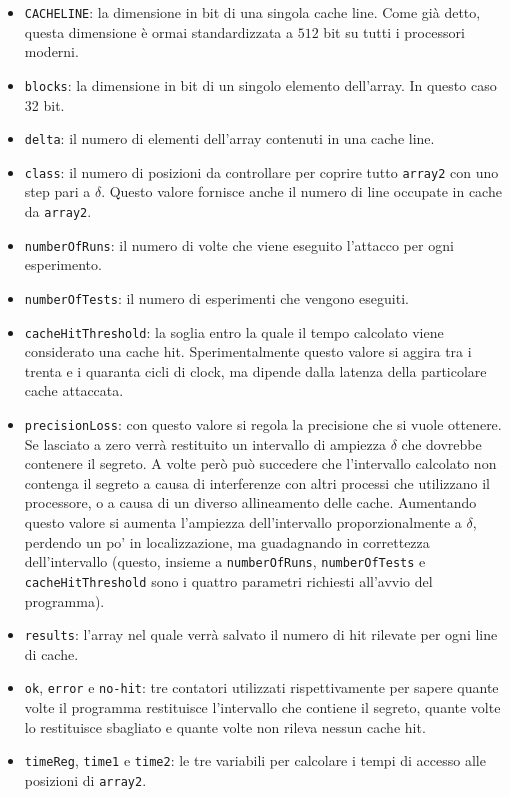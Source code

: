 				\begin{itemize}
					\item \texttt{CACHELINE}: la dimensione in bit di una singola cache line. Come già detto, questa dimensione è ormai standardizzata a $512$ bit su tutti i processori moderni.
					
					\item \texttt{blocks}: la dimensione in bit di un singolo elemento dell'array. In questo caso 32 bit.
					
					\item \texttt{delta}: il numero di elementi dell'array contenuti in una cache line.
					
					\item \texttt{class}: il numero di posizioni da controllare per coprire tutto \texttt{array2} con uno step pari a $\delta$. Questo valore fornisce anche il numero di line occupate in cache da \texttt{array2}.
					
					\item \texttt{numberOfRuns}: il numero di volte che viene eseguito l'attacco per ogni esperimento.
					
					\item \texttt{numberOfTests}: il numero di esperimenti che vengono eseguiti.
					
					\item \texttt{cacheHitThreshold}: la soglia entro la quale il tempo calcolato viene considerato una cache hit. Sperimentalmente questo valore si aggira tra i trenta e i quaranta cicli di clock, ma dipende dalla latenza della particolare cache attaccata.
					
					\item \texttt{precisionLoss}: con questo valore si regola la precisione che si vuole ottenere. Se lasciato a zero verrà restituito un intervallo di ampiezza $\delta$ che dovrebbe contenere il segreto. A volte però può succedere che l'intervallo calcolato non contenga il segreto a causa di interferenze con altri processi che utilizzano il processore, o a causa di un diverso allineamento delle cache. Aumentando questo valore si aumenta l'ampiezza dell'intervallo proporzionalmente a $\delta$, perdendo un po' in localizzazione, ma guadagnando in correttezza dell'intervallo (questo, insieme a \texttt{numberOfRuns}, \texttt{numberOfTests} e \texttt{cacheHitThreshold} sono i quattro parametri richiesti all'avvio del programma).		
								
					\item \texttt{results}: l'array nel quale verrà salvato il numero di hit rilevate per ogni line di cache.
					
					\item \texttt{ok}, \texttt{error} e \texttt{no-hit}: tre contatori utilizzati rispettivamente per sapere quante volte il programma restituisce l'intervallo che contiene il segreto, quante volte lo restituisce sbagliato e quante volte non rileva nessun cache hit.
					
					\item \texttt{timeReg}, \texttt{time1} e \texttt{time2}: le tre variabili per calcolare i tempi di accesso alle posizioni di \texttt{array2}.
				\end{itemize}			
